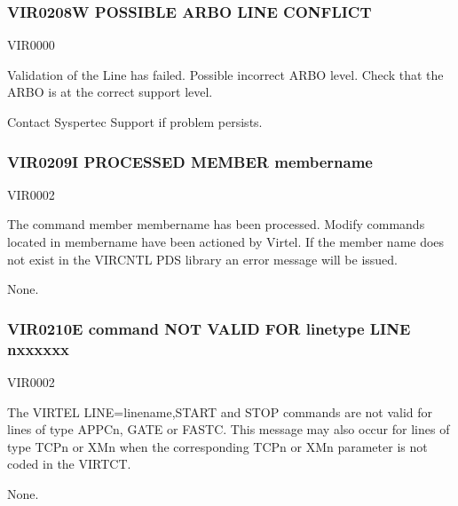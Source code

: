 \documentclass[letterpaper,10pt,english]{sphinxmanual}
\begin{document}
\subsubsection{VIR0208W POSSIBLE ARBO LINE CONFLICT}
\label{\detokenize{messages:vir0208w-possible-arbo-line-conflict}}\begin{description}
\sphinxAtStartPar
VIR0000

\sphinxAtStartPar
Validation of the Line has failed. Possible incorrect ARBO level. Check that the ARBO is at the correct support level.

\sphinxAtStartPar
Contact Syspertec Support if problem persists.

\end{description}


\subsubsection{VIR0209I PROCESSED MEMBER membername}
\label{\detokenize{messages:vir0209i-processed-member-membername}}\begin{description}
\sphinxAtStartPar
VIR0002

\sphinxAtStartPar
The command member membername has been processed. Modify commands located in membername have been actioned by Virtel. If the member name does not exist in the VIRCNTL PDS library an error message will be issued.

\sphinxAtStartPar
None.

\end{description}


\subsubsection{VIR0210E command NOT VALID FOR linetype LINE n\sphinxhyphen{}xxxxxx}
\label{\detokenize{messages:vir0210e-command-not-valid-for-linetype-line-n-xxxxxx}}\begin{description}
\sphinxAtStartPar
VIR0002

\sphinxAtStartPar
The VIRTEL LINE=linename,START and STOP commands are not valid for lines of type APPCn, GATE or FASTC. This message may also occur for lines of type TCPn or XMn when the corresponding TCPn or XMn parameter is not coded in the VIRTCT.

\sphinxAtStartPar
None.

\end{description}
\end{document}
